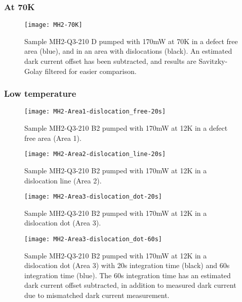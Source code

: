 \subsubsection{At 70K}
\begin{figure}[H]
\centering
\texttt{[image: MH2-70K]}
\caption[MH2-Q3-210 at 70K]{Sample MH2-Q3-210 D pumped with 170mW at 70K in a defect free area (blue), and in an area with dislocations (black). An estimated dark current offset has been subtracted, and results are Savitzky-Golay filtered for easier comparison.}
\label{fig:MH2-70K}%
\end{figure}

\subsubsection{Low temperature}

\begin{figure}[H]
\centering
\texttt{[image: MH2-Area1-dislocation\_free-20s]}
\caption[MH2-Q3-210 at area 1]{Sample MH2-Q3-210 B2 pumped with 170mW at 12K in a defect free area (Area 1).}
\label{fig:MH2-Area1-dislocation_free-20s}%
\end{figure}

\begin{figure}[H]
\centering
\texttt{[image: MH2-Area2-dislocation\_line-20s]}
\caption[MH2-Q3-210 at area 2]{Sample MH2-Q3-210 B2 pumped with 170mW at 12K in a dislocation line (Area 2).}
\label{fig:MH2-Area2-dislocation_line-20s}%
\end{figure}

\begin{figure}[H]
\centering
\texttt{[image: MH2-Area3-dislocation\_dot-20s]}
\caption[MH2-Q3-210 at area 3]{Sample MH2-Q3-210 B2 pumped with 170mW at 12K in a dislocation dot (Area 3).}
\label{fig:MH2-Area3-dislocation_dot-20s}%
\end{figure}

\begin{figure}[H]
\centering
\texttt{[image: MH2-Area3-dislocation\_dot-60s]}
\caption[MH2-Q3-210 at area 3]{Sample MH2-Q3-210 B2 pumped with 170mW at 12K in a dislocation dot (Area 3) with 20s integration time (black) and 60s integration time (blue). The 60s integration time has an estimated dark current offset subtracted, in addition to measured dark current due to mismatched dark current measurement.}
\label{fig:MH2-Area3-dislocation_dot-60s}%
\end{figure}



